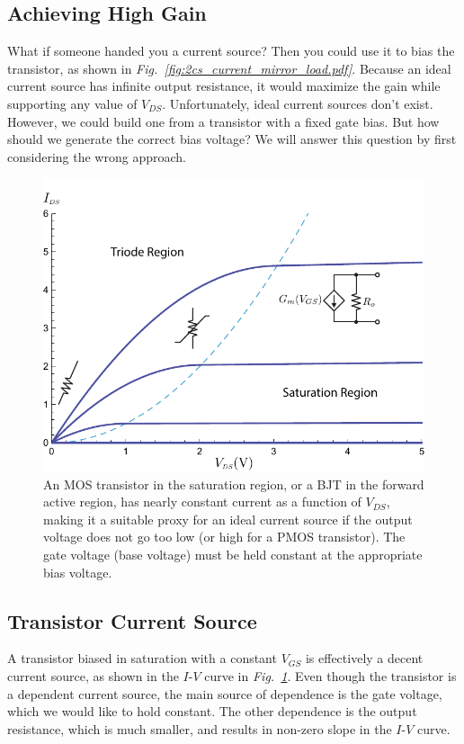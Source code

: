 \subsection{Achieving High Gain}
What if someone handed you a current source?  Then you could use it to bias the transistor, as shown in \emph{Fig.~\ref{fig:2cs_current_mirror_load.pdf}}.  Because an ideal current source has infinite output resistance, it would maximize the gain while supporting any value of $V_{DS}$.  Unfortunately, ideal current sources don't exist.  However, we could build one from a transistor with a fixed gate bias.  But how should we generate the correct bias voltage?  We will answer this question by first considering the wrong approach.
\newpage
\begin{figure}[t]
\centering
\includegraphics[width=.85\columnwidth]{mos_building_block.pdf}
\caption{An MOS transistor in the saturation region, or a BJT in the forward active region, has nearly constant current as a function of $V_{DS}$, making it a suitable proxy for an ideal current source if the output voltage does not go too low (or high for a PMOS transistor).  The gate voltage (base voltage) must be held constant at the appropriate bias voltage.}
\label{fig:mos_building_block.pdf}
\end{figure}
\subsection{Transistor Current Source}
A transistor biased in saturation with a constant $V_{GS}$ is effectively a decent current source, as shown in the $I$-$V$ curve in \emph{Fig.~\ref{fig:mos_building_block.pdf}}.  Even though the transistor is a dependent current source, the main source of dependence is the gate voltage, which we would like to hold constant.  The other dependence is the output resistance, which is much smaller, and results in non-zero slope in the $I$-$V$ curve. 
